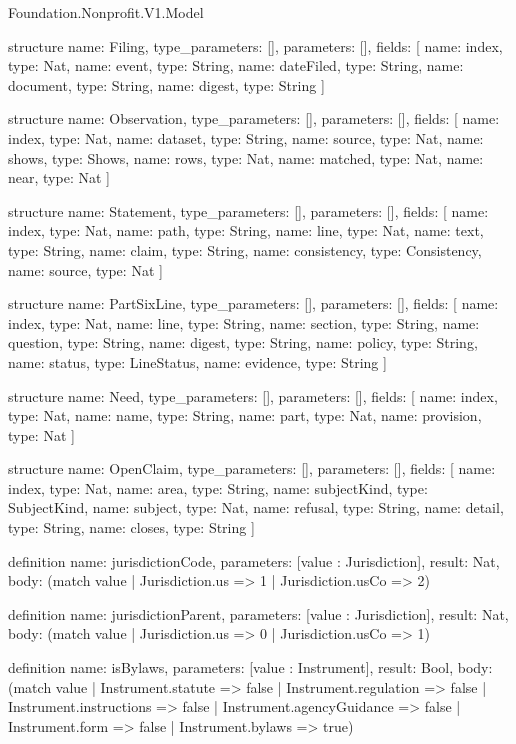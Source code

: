 \begin{lexlean}{Foundation.Nonprofit.V1.Model}
\begin{semanticmodule}
structure{
  name: Filing,
  type_parameters: [],
  parameters: [],
  fields: [
    {name: index, type: Nat},
    {name: event, type: String},
    {name: dateFiled, type: String},
    {name: document, type: String},
    {name: digest, type: String}
  ]
}

structure{
  name: Observation,
  type_parameters: [],
  parameters: [],
  fields: [
    {name: index, type: Nat},
    {name: dataset, type: String},
    {name: source, type: Nat},
    {name: shows, type: Shows},
    {name: rows, type: Nat},
    {name: matched, type: Nat},
    {name: near, type: Nat}
  ]
}

structure{
  name: Statement,
  type_parameters: [],
  parameters: [],
  fields: [
    {name: index, type: Nat},
    {name: path, type: String},
    {name: line, type: Nat},
    {name: text, type: String},
    {name: claim, type: String},
    {name: consistency, type: Consistency},
    {name: source, type: Nat}
  ]
}

structure{
  name: PartSixLine,
  type_parameters: [],
  parameters: [],
  fields: [
    {name: index, type: Nat},
    {name: line, type: String},
    {name: section, type: String},
    {name: question, type: String},
    {name: digest, type: String},
    {name: policy, type: String},
    {name: status, type: LineStatus},
    {name: evidence, type: String}
  ]
}

structure{
  name: Need,
  type_parameters: [],
  parameters: [],
  fields: [
    {name: index, type: Nat},
    {name: name, type: String},
    {name: part, type: Nat},
    {name: provision, type: Nat}
  ]
}

structure{
  name: OpenClaim,
  type_parameters: [],
  parameters: [],
  fields: [
    {name: index, type: Nat},
    {name: area, type: String},
    {name: subjectKind, type: SubjectKind},
    {name: subject, type: Nat},
    {name: refusal, type: String},
    {name: detail, type: String},
    {name: closes, type: String}
  ]
}

definition{
  name: jurisdictionCode,
  parameters: [value : Jurisdiction],
  result: Nat,
  body: (match value | Jurisdiction.us => 1 | Jurisdiction.usCo => 2)
}

definition{
  name: jurisdictionParent,
  parameters: [value : Jurisdiction],
  result: Nat,
  body: (match value | Jurisdiction.us => 0 | Jurisdiction.usCo => 1)
}

definition{
  name: isBylaws,
  parameters: [value : Instrument],
  result: Bool,
  body: (match value
    | Instrument.statute => false
    | Instrument.regulation => false
    | Instrument.instructions => false
    | Instrument.agencyGuidance => false
    | Instrument.form => false
    | Instrument.bylaws => true)
}


\end{semanticmodule}
\end{lexlean}
